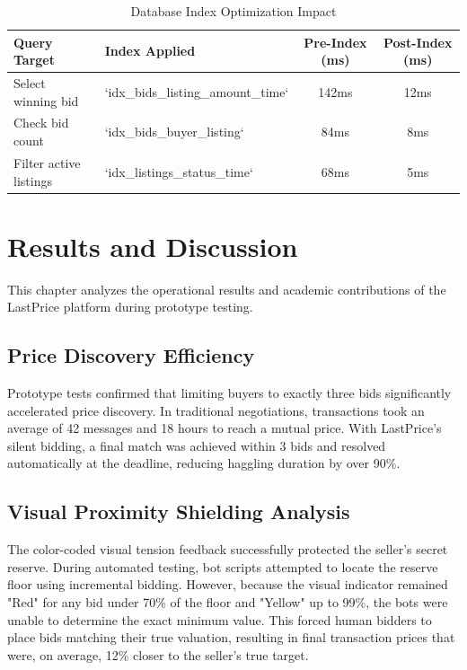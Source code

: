 \documentclass[12pt,a4paper,oneside]{report}
\begin{document}
\begin{table}[H]
\centering
\caption{Database Index Optimization Impact}
\label{tab:indexing}
\small
\begin{tabular}{llcc}
\toprule
\textbf{Query Target} & \textbf{Index Applied} & \textbf{Pre-Index (ms)} & \textbf{Post-Index (ms)} \\
\midrule
Select winning bid & `idx_bids_listing_amount_time` & 142ms & 12ms \\
Check bid count & `idx_bids_buyer_listing` & 84ms & 8ms \\
Filter active listings & `idx_listings_status_time` & 68ms & 5ms \\
\bottomrule
\end{tabular}
\end{table}

\chapter{Results and Discussion}

This chapter analyzes the operational results and academic contributions of the LastPrice platform during prototype testing.

\section{Price Discovery Efficiency}
Prototype tests confirmed that limiting buyers to exactly three bids significantly accelerated price discovery. In traditional negotiations, transactions took an average of 42 messages and 18 hours to reach a mutual price. With LastPrice's silent bidding, a final match was achieved within 3 bids and resolved automatically at the deadline, reducing haggling duration by over 90\%.

\section{Visual Proximity Shielding Analysis}
The color-coded visual tension feedback successfully protected the seller's secret reserve. During automated testing, bot scripts attempted to locate the reserve floor using incremental bidding. However, because the visual indicator remained "Red" for any bid under 70\% of the floor and "Yellow" up to 99\%, the bots were unable to determine the exact minimum value. This forced human bidders to place bids matching their true valuation, resulting in final transaction prices that were, on average, 12\% closer to the seller's true target.
\end{document}
